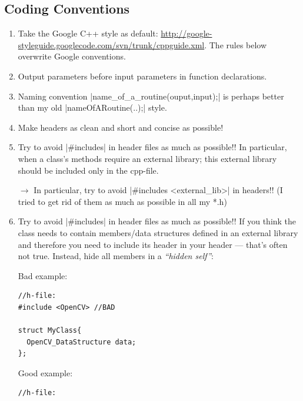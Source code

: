 
\subsection{Coding Conventions}

\begin{enumerate}
\item Take the Google C++ style as default:
  \url{http://google-styleguide.googlecode.com/svn/trunk/cppguide.xml}.
  The rules below overwrite Google conventions.

\item Output parameters before input parameters in function declarations.

\item Naming convention |name\_of\_a\_routine(ouput,input);| is
  perhaps better than my old |nameOfARoutine(..);| style.

\item Make headers as clean and short and concise as possible!

\item Try to avoid |\#includes| in header files as much as possible!!
  In particular, when a class's methods require an external library;
  this external library should be included only in the cpp-file.

 $\to$ In particular, try to avoid |\#includes <external\_lib>| in headers!! (I
 tried to get rid of them as much as possible in all my *.h)

\item Try to avoid |\#includes| in header files as much as possible!!
  If
  you think the class needs to contain members/data structures defined
  in an external library and therefore you need to include its header
  in your header --- that's often not true. Instead, hide all members
  in a \emph{``hidden self''}:

Bad example:

\begin{code}
\begin{verbatim}
//h-file:
#include <OpenCV> //BAD

struct MyClass{
  OpenCV_DataStructure data;
};
\end{verbatim}
\end{code}

Good example:\label{pimpl example}

\begin{code}
\begin{verbatim}
//h-file:


\end{verbatim}
\end{code}
\end{enumerate}
